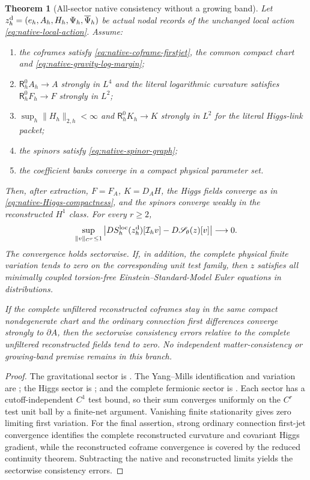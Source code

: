 \documentclass[11pt]{article}
\numberwithin{equation}{section}
\newtheorem{theorem}{Theorem}[section]
\theoremstyle{definition}
\theoremstyle{remark}
\newcommand{\norm}[1]{\lVert#1\rVert}
\newcommand{\Sact}{\mathscr S}
\newcommand{\bPsi}{\overline\Psi}
\begin{document}
\begin{theorem}[All-sector native consistency without a growing band]
\label{thm:native-firstvariation-no-band}
Let $z_h^{\rm d}=(e_h,A_h,H_h,\Psi_h,\bPsi_h)$ be actual nodal records of
the unchanged local action \eqref{eq:native-local-action}.  Assume:
\begin{enumerate}[label=\textup{(N\arabic*)},leftmargin=3.2em]
\item the coframes satisfy \eqref{eq:native-coframe-firstjet}, the common
      compact chart and \eqref{eq:native-gravity-log-margin};
\item $\mathsf R_h^0A_h\to A$ strongly in $L^4$ and the literal logarithmic
      curvature satisfies $\mathsf R_h^0F_h\to F$ strongly in $L^2$;
\item $\sup_h\norm{H_h}_{2,h}<\infty$ and
      $\mathsf R_h^0K_h\to K$ strongly in $L^2$ for the literal Higgs-link
      packet;
\item the spinors satisfy \eqref{eq:native-spinor-graph};
\item the coefficient banks converge in a compact physical parameter set.
\end{enumerate}
Then, after extraction, $F=F_A$, $K=D_AH$, the Higgs fields converge as in
\eqref{eq:native-Higgs-compactness}, and the spinors converge weakly in the
reconstructed $H^1$ class.  For every $r\ge2$,
\begin{equation}
 \sup_{\norm v_{C^r}\le1}
 \left|D S_h^{\rm loc}(z_h^{\rm d})[\mathcal I_hv]
       -D\Sact_\theta(z)[v]\right|\longrightarrow0.
 \label{eq:native-all-sector-limit}
\end{equation}
The convergence holds sectorwise.  If, in addition, the complete physical
finite variation tends to zero on the corresponding unit test family, then
$z$ satisfies all minimally coupled torsion-free Einstein--Standard-Model
Euler equations in distributions.

If the complete unfiltered reconstructed coframes stay in the same compact
nondegenerate chart and the ordinary connection first differences converge
strongly to $\partial A$, then the sectorwise consistency errors relative to
the complete unfiltered reconstructed fields tend to zero.  No independent
matter-consistency or growing-band premise remains in this branch.
\end{theorem}
\begin{proof}
The gravitational sector is .  The
Yang--Mills identification and variation are
; the Higgs sector is
; and the complete fermionic sector is
.  Each sector has a cutoff-independent
$C^1$ test bound, so their sum converges uniformly on the $C^r$ test unit
ball by a finite-net argument.  Vanishing finite stationarity gives zero
limiting first variation.  For the final assertion, strong ordinary
connection first-jet convergence identifies the complete reconstructed
curvature and covariant Higgs gradient, while the reconstructed coframe
convergence is covered by the reduced continuity theorem.  Subtracting the
native and reconstructed limits yields the sectorwise consistency errors.
\end{proof}
\end{document}
